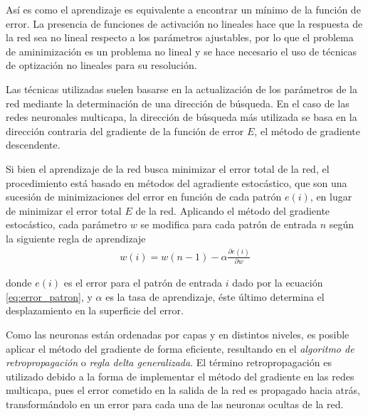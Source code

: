 Así es como el aprendizaje es equivalente a encontrar un mínimo de la función de error. La presencia de funciones de activación no lineales hace que la respuesta de la red sea no lineal respecto a los parámetros ajustables, por lo que el problema de aminimización es un problema no lineal y se hace necesario el uso de técnicas de optización no lineales para su resolución.

Las técnicas utilizadas suelen basarse en la actualización de los parámetros de la red mediante la determinación de una dirección de búsqueda. En el caso de las redes neuronales multicapa, la dirección de búsqueda más utilizada se basa en la dirección contraria del gradiente de la función de error $E$, el método de gradiente descendente.

Si bien el aprendizaje de la red busca minimizar el error total de la red, el procedimiento está basado en métodos del agradiente estocástico, que son una sucesión de minimizaciones del error en función de cada patrón $e(i)$, en lugar de minimizar el error total $E$ de la red. Aplicando el método del gradiente estocástico, cada parámetro $w$ se modifica para cada patrón de entrada $n$ según la siguiente regla de aprendizaje
\begin{eqnarray}
	w(i) = w(n - 1) - \alpha\frac{\partial e(i)}{\partial w}
\end{eqnarray}

donde $e(i)$ es el error para el patrón de entrada $i$ dado por la ecuación \ref{eq:error_patron}, y $\alpha$ es la tasa de aprendizaje, éste último determina el desplazamiento en la superficie del error.

Como las neuronas están ordenadas por capas y en distintos niveles, es posible aplicar el método del gradiente de forma eficiente, resultando en el {\em algoritmo de retropropagación} \cite{Rumelhart1986} o {\em regla delta generalizada}. El término retropropagación es utilizado debido a la forma de implementar el método del gradiente en las redes multicapa, pues el error cometido en la salida de la red es propagado hacia atrás, transformándolo en un error para cada una de las neuronas ocultas de la red.






